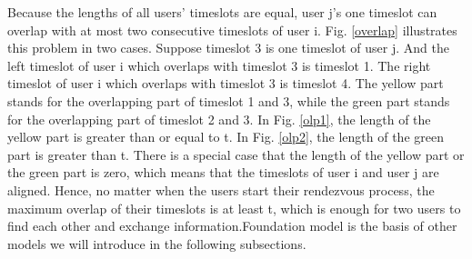 \documentclass[10pt, conference, letterpaper]{IEEEtran}
\begin{document}
Because the lengths of all users' timeslots are equal, user j's one timeslot can overlap with at most two consecutive timeslots of user i. Fig. \ref{overlap} illustrates this problem in two cases. Suppose timeslot 3 is one timeslot of user j. And the left timeslot of user i which overlaps with timeslot 3 is timeslot 1. The right timeslot of user i which overlaps with timeslot 3 is timeslot 4. The yellow part stands for the overlapping part of timeslot 1 and 3, while the green part stands for the overlapping part of timeslot 2 and 3. In Fig. \ref{olp1}, the length of the yellow part is greater than or equal to t. In Fig. \ref{olp2}, the length of the green part is greater than t.
There is a special case that the length of the yellow part or the green part is zero, which means that the timeslots of user i and user j are aligned.
Hence, no matter when the users start their rendezvous process, the maximum overlap of their timeslots is at least t, which is enough for two users to find each other and exchange information.Foundation model is the basis of other models we will introduce in the following subsections.
%
\end{document}
